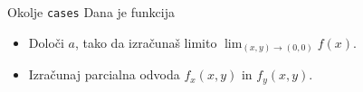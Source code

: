 \begin{frame}{Okolje \texttt{cases}}
	Dana je funkcija
	
		
	\begin{itemize}
	\item Določi $a$, tako da izračunaš limito \( \lim_{(x,y)\to(0,0)} f(x). \)
	\item Izračunaj parcialna odvoda $f_x(x,y)$ in $f_y(x,y)$.
	\end{itemize}
\end{frame}
